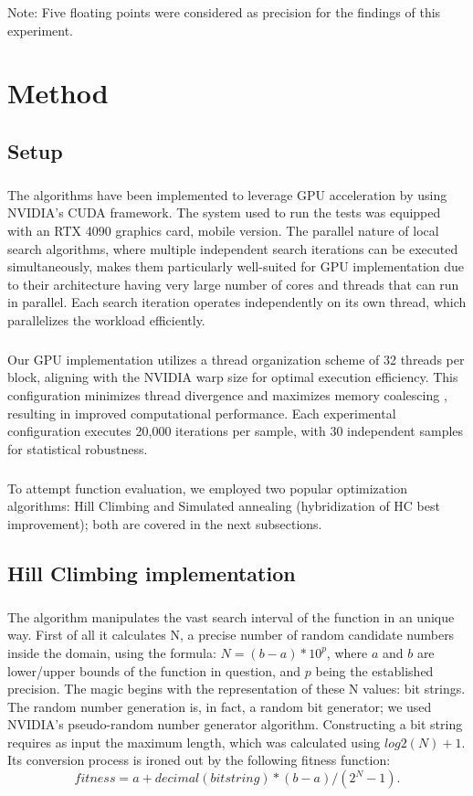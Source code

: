 \documentclass{article}
\begin{document}
Note: Five floating points were considered as precision for the findings of this experiment.


\section{Method}

\subsection{Setup}

\subparagraph{}
The algorithms have been implemented to leverage GPU acceleration by using NVIDIA's CUDA framework. The system used to run the tests was equipped with an RTX 4090 graphics card, mobile version. The parallel nature of local search algorithms, where multiple independent search iterations can be executed simultaneously, makes them particularly well-suited for GPU implementation due to their architecture having very large number of cores and threads that can run in parallel. Each search iteration operates independently on its own thread, which parallelizes the workload efficiently.

\subparagraph{}
Our GPU implementation utilizes a thread organization scheme of 32 threads per block, aligning with the NVIDIA warp size for optimal execution efficiency. This configuration minimizes thread divergence and maximizes memory coalescing \cite{cuda}, resulting in improved computational performance. Each experimental configuration executes 20,000 iterations per sample, with 30 independent samples for statistical robustness.

\subparagraph{}
To attempt function evaluation, we employed two popular optimization algorithms: Hill Climbing and Simulated annealing (hybridization of HC best improvement); both are covered in the next subsections.

\subsection{Hill Climbing implementation}

\subparagraph{}
The algorithm manipulates the vast search interval of the function in an unique way. First of all it calculates N, a precise number of random candidate numbers inside the domain, using the formula: $ N = (b-a)*10^p$,  where $a$ and $b$ are lower/upper bounds of the function in question, and $p$ being the established precision. The magic begins with the representation of these N values: bit strings. The random number generation is, in fact, a random bit generator; we used NVIDIA's pseudo-random number generator algorithm. Constructing a bit string requires as input the maximum length, which was calculated using $log2(N) + 1$. Its conversion process is ironed out by the following fitness function: $$fitness = a + decimal(bitstring) * (b - a) / (2^N - 1) .$$
\end{document}
